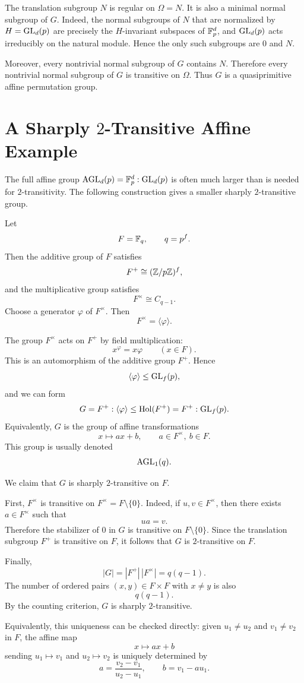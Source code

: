 \begin{remark}
The translation subgroup \(N\) is regular on \(\Omega=N\). It is also a minimal
normal subgroup of \(G\). Indeed, the normal subgroups of \(N\) that are normalized
by \(H=\operatorname{GL}_d(p)\) are precisely the \(H\)-invariant subspaces of \(\mathbb{F}_p^d\), and
\(\operatorname{GL}_d(p)\) acts irreducibly on the natural module. Hence the only such subgroups
are \(0\) and \(N\).

Moreover, every nontrivial normal subgroup of \(G\) contains \(N\). Therefore every
nontrivial normal subgroup of \(G\) is transitive on \(\Omega\). Thus \(G\) is a
quasiprimitive affine permutation group.
\end{remark}

\section{A Sharply \texorpdfstring{$2$}{2}-Transitive Affine Example}

The full affine group \(\operatorname{AGL}_d(p)=\mathbb{F}_p^d:\operatorname{GL}_d(p)\) is often much larger than is
needed for \(2\)-transitivity. The following construction gives a smaller sharply
\(2\)-transitive group.

\begin{example}
Let
\[
    F=\mathbb{F}_q,
    \qquad q=p^f.
\]
Then the additive group of \(F\) satisfies
\[
    F^+\cong (\mathbb{Z}/p\mathbb{Z})^f,
\]
and the multiplicative group satisfies
\[
    F^\times\cong C_{q-1}.
\]
Choose a generator \(\varphi\) of \(F^\times\). Then
\[
    F^\times=\langle \varphi\rangle.
\]

The group \(F^\times\) acts on \(F^+\) by field multiplication:
\[
    x^\varphi=x\varphi
    \qquad (x\in F).
\]
This is an automorphism of the additive group \(F^+\). Hence
\[
    \langle \varphi\rangle\leq \operatorname{GL}_f(p),
\]
and we can form
\[
    G=F^+:\langle \varphi\rangle
    \leq
    \operatorname{Hol}(F^+)
    =
    F^+:\operatorname{GL}_f(p).
\]
Equivalently, \(G\) is the group of affine transformations
\[
    x\mapsto ax+b,
    \qquad
    a\in F^\times,\ b\in F.
\]
This group is usually denoted
\[
    \operatorname{AGL}_1(q).
\]

We claim that \(G\) is sharply \(2\)-transitive on \(F\).

First, \(F^\times\) is transitive on \(F^\times=F\setminus\{0\}\). Indeed, if
\(u,v\in F^\times\), then there exists \(a\in F^\times\) such that
\[
    ua=v.
\]
Therefore the stabilizer of \(0\) in \(G\) is transitive on \(F\setminus\{0\}\).
Since the translation subgroup \(F^+\) is transitive on \(F\), it follows that
\(G\) is \(2\)-transitive on \(F\).

Finally,
\[
    |G|=|F^+|\,|F^\times|=q(q-1).
\]
The number of ordered pairs \((x,y)\in F\times F\) with \(x\neq y\) is also
\[
    q(q-1).
\]
By the counting criterion, \(G\) is sharply \(2\)-transitive.

Equivalently, this uniqueness can be checked directly: given \(u_1\neq u_2\) and
\(v_1\neq v_2\) in \(F\), the affine map
\[
    x\mapsto ax+b
\]
sending \(u_1\mapsto v_1\) and \(u_2\mapsto v_2\) is uniquely determined by
\[
    a=\frac{v_2-v_1}{u_2-u_1},
    \qquad
    b=v_1-a u_1.
\]
\end{example}
